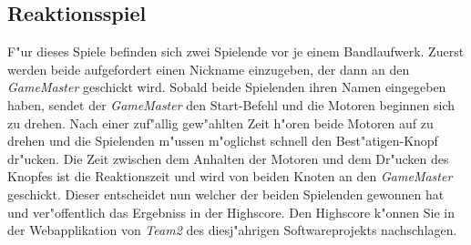 \documentclass[a4paper]{article}
\begin{document}
  \subsection{Reaktionsspiel}
    \label{sec:retro11_game}
    F"ur dieses Spiele befinden sich zwei Spielende vor je einem Bandlaufwerk.
    Zuerst werden beide aufgefordert einen Nickname einzugeben, der dann an den
    \textit{GameMaster} geschickt wird. Sobald beide Spielenden ihren Namen
    eingegeben haben, sendet der \textit{GameMaster} den Start-Befehl und die
    Motoren beginnen sich zu drehen. Nach einer zuf"allig gew"ahlten Zeit
    h"oren beide Motoren auf zu drehen und die Spielenden m"ussen m"oglichst
    schnell den Best"atigen-Knopf dr"ucken. Die Zeit zwischen dem Anhalten
    der Motoren und dem Dr"ucken des Knopfes ist die Reaktionszeit und wird von
    beiden Knoten an den \textit{GameMaster} geschickt. Dieser entscheidet nun
    welcher der beiden Spielenden gewonnen hat und ver"offentlich das Ergebniss
    in der Highscore. Den Highscore k"onnen Sie in der Webapplikation von
    \textit{Team2} des diesj"ahrigen Softwareprojekts nachschlagen.
\end{document}
